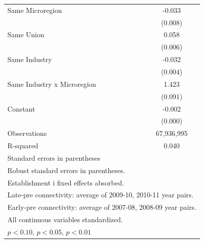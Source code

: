 \begin{table}[htbp]
\begin{tabular}{l*{1}{c}}
\addlinespace
Same Microregion    &      -0.033\sym{***}\\
                    &     (0.008)         \\
\addlinespace
Same Union          &       0.058\sym{***}\\
                    &     (0.006)         \\
\addlinespace
Same Industry       &      -0.032\sym{***}\\
                    &     (0.004)         \\
\addlinespace
Same Industry x Microregion&       1.423\sym{***}\\
                    &     (0.091)         \\
\addlinespace
Constant            &      -0.002\sym{***}\\
                    &     (0.000)         \\
\midrule
Observations        &  67,936,995         \\
R-squared           &       0.040         \\
\bottomrule
\multicolumn{2}{l}{\footnotesize Standard errors in parentheses}\\
\multicolumn{2}{l}{\footnotesize Robust standard errors in parentheses.}\\
\multicolumn{2}{l}{\footnotesize Establishment i fixed effects absorbed.}\\
\multicolumn{2}{l}{\footnotesize Late-pre connectivity: average of 2009-10, 2010-11 year pairs.}\\
\multicolumn{2}{l}{\footnotesize Early-pre connectivity: average of 2007-08, 2008-09 year pairs.}\\
\multicolumn{2}{l}{\footnotesize All continuous variables standardized.}\\
\multicolumn{2}{l}{\footnotesize \sym{*} \(p<0.10\), \sym{**} \(p<0.05\), \sym{***} \(p<0.01\)}\\
\end{tabular}
\end{table}
